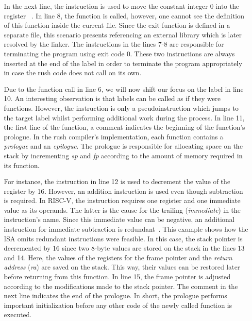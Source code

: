 In the next line, the  instruction is used to move the constant integer 0 into the register ~\cite[reference]{Patterson2017}.
In line 8, the  function is called, however, one cannot see the definition of this function inside the current file.
Since the exit-function is defined in a separate file, this scenario presents referencing an external library which is later resolved by the linker.
The instructions in the lines 7-8 are responsible for terminating the program using exit code 0.
These two instructions are always inserted at the end of the  label in order to terminate the program appropriately in case the rush code does not call  on its own.

Due to the function call in line 6, we will now shift our focus on the  label in line 10.
An interesting observation is that labels can be called as if they were functions.
However, the  instruction is only a pseudoinstruction which jumps to the target label whilst performing additional work during the process.
In line 11, the first line of the  function, a comment indicates the beginning of the function's prologue.
In the rush compiler's implementation, each function contains a \emph{prologue} and an \emph{epilogue}.
The prologue is responsible for allocating space on the stack by incrementing \emph{sp} and \emph{fp} according to the amount of memory required in its function.

For instance, the  instruction in line 12 is used to decrement the value of the  register by 16.
However, an addition instruction is used even though subtraction is required.
In RISC-V, the  instruction requires one register and one immediate value as its operands.
The latter is the cause for the trailing  (\emph{immediate}) in the instruction's name.
Since this immediate value can be negative, an additional instruction for immediate subtraction is redundant~\cite[reference]{Patterson2017}.
This example shows how the ISA omits redundant instructions were feasible.
In this case, the stack pointer is decremented by 16 since two 8-byte values are stored on the stack in the lines 13 and 14.
Here, the values of the registers for the frame pointer and the \emph{return address} (\emph{ra}) are saved on the stack.
This way, their values can be restored later before returning from this function.
In line 15, the frame pointer is adjusted according to the modifications made to the stack pointer.
The comment in the next line indicates the end of the prologue.
In short, the prologue performs important initialization before any other code of the newly called function is executed.

